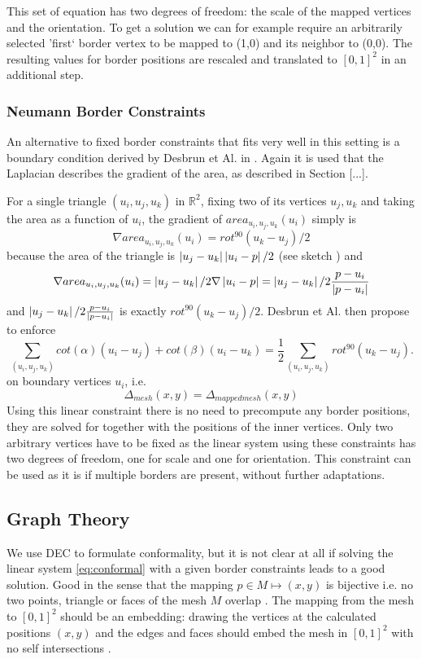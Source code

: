This set of equation has two degrees of freedom: the scale of the mapped vertices and the orientation. To get a solution we can for example require an arbitrarily selected 'first` border vertex to be mapped to (1,0) and its neighbor to (0,0). The resulting values for border positions are rescaled and translated to $[0,1]^2$ in an additional step.


\subsubsection{Neumann Border Constraints}
An alternative to fixed border constraints that fits very well in this setting is a boundary condition derived by Desbrun et Al. in . Again it is used that the Laplacian describes the gradient of the area, as described in Section [...]. 

For a single triangle $(u_i,u_j,u_k)$ in $\mathbb R^2$, fixing two of its vertices $u_j, u_k$ and taking the area as a function of $u_i$, the gradient of $area_{u_i,u_j,u_k}(u_i)$ simply is
\[ \nabla area_{u_i,u_j,u_k}(u_i) = rot^{90}(u_k-u_j)/2\]
because the area of the triangle is $\left| u_j-u_k \right|\left| u_i-p \right|/2$ (see sketch ) and
\[ \nabla area_{u_i,u_j,u_k}(u_i) = \left| u_j-u_k \right|/2  \nabla \left| u_i-p \right|= \left| u_j-u_k \right|/2 \frac{p-u_i}{\left| p-u_i \right|}\]
and $\left| u_j-u_k \right|/2 \frac{p-u_i}{\left| p-u_i \right|}$ is exactly $rot^{90}(u_k-u_j)/2$. Desbrun et Al. then propose to enforce
\[\sum_{(u_i,u_j,u_k)}cot(\alpha) (u_i-u_j) + cot(\beta) (u_i - u_k) = \frac{1}{2}\sum_{(u_i,u_j,u_k)}rot^{90}(u_k-u_j).\]
on boundary vertices $u_i$, i.e.
\[\Delta_{mesh} (x,y) = \Delta_{mappedmesh}(x,y)\]
Using this linear constraint there is no need to precompute any border positions, they are solved for together with the positions of the inner vertices. Only two arbitrary vertices have to be fixed as the linear system using these constraints has two degrees of freedom, one for scale and one for orientation. This constraint can be used as it is if multiple borders are present, without further adaptations.

\subsection{Graph Theory}
We use DEC to formulate conformality, but it is not clear at all if solving the linear system \ref{eq:conformal} with a given border constraints leads to a good solution. Good in the sense that the mapping $p\in M \mapsto (x,y)$ is bijective i.e. no two points, triangle or faces of the mesh $M$ overlap . The mapping from the mesh to $[0,1]^2$ should be an embedding: drawing the vertices at the calculated positions $(x,y)$ and the edges and faces should embed the mesh in $[0,1]^2$ with no self intersections . 

